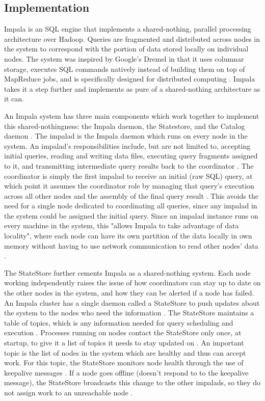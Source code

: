 \documentclass[onecolumn, draftclsnofoot,10pt, compsoc]{IEEEtran}
\begin{document}
	
    \subsection{Implementation}
    Impala is an SQL engine that implements a shared-nothing, parallel processing architecture over Hadoop.
    Queries are fragmented and distributed across nodes in the system to correspond with the portion of data stored locally on individual nodes.
    The system was inspired by Google’s Dremel in that it uses columnar storage, executes SQL commands natively instead of building them on top of MapReduce jobs, and is specifically designed for distributed computing \cite{SQLonHadoop} \cite{Dremel}.
    Impala takes it a step further and implements as pure of a shared-nothing architecture as it can.

An Impala system has three main components which work together to implement this shared-nothingness: the Impala daemon, the Statestore, and the Catalog daemon \cite{ImpalaGuide}. 
The impalad is the Impala daemon which runs on every node in the system.
An impalad's responsibilities include, but are not limited to, accepting initial queries, reading and writing data files, executing query fragments assigned to it, and transmitting intermediate query results back to the coordinator \cite{Impala} \cite{ImpalaGuide}.
The coordinator is simply the first impalad to receive an initial (raw SQL) query, at which point it assumes the coordinator role by managing that query’s execution across all other nodes and the assembly of the final query result \cite{Impala}. 
This avoids the need for a single node dedicated to coordinating all queries, since any impalad in the system could be assigned the initial query.
Since an impalad instance runs on every machine in the system, this "allows Impala to take advantage of data locality", where each node can have its own partition of the data locally in own memory without having to use network communication to read other nodes’ data \cite{Impala}.

The StateStore further cements Impala as a shared-nothing system. Each node working independently raises the issue of how coordinators can stay up to date on the other nodes in the system, and how they can be alerted if a node has failed.
An Impala cluster has a single daemon called a StateStore to push updates about the system to the nodes who need the information \cite{Impala}.
The StateStore maintains a table of topics, which is any information needed for query scheduling and execution \cite{ImpalaGuide}.
Processes running on nodes contact the StateStore only once, at startup, to give it a list of topics it needs to stay updated on \cite{Impala}. 
An important topic is the list of nodes in the system which are healthy and thus can accept work. 
For this topic, the StateStore monitors node health through the use of keepalive messages \cite{Impala}.
If a node goes offline (doesn’t respond to to the keepalive message), the StateStore broadcasts this change to the other impalads, so they do not assign work to an unreachable node \cite{ImpalaGuide}.
\end{document}
